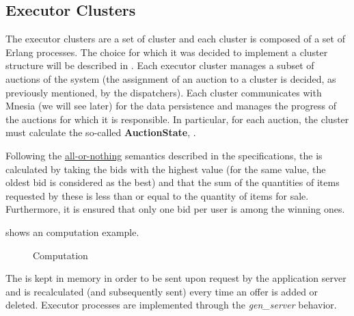 \subsection{Executor Clusters}\label{subsec:archexecutors}

The executor clusters are a set of cluster and each cluster is composed of a set
of Erlang processes. The choice for which it was decided to implement a cluster
structure will be described in . Each executor
cluster manages a subset of auctions of the system (the assignment of an auction
to a cluster is decided, as previously mentioned, by the dispatchers). Each
cluster communicates with Mnesia (we will see later) for the data persistence
and manages the progress of the auctions for which it is responsible. In
particular, for each auction, the cluster must calculate the so-called
\textbf{AuctionState}, .


Following the \underline{all-or-nothing} semantics described in the
specifications, the  is calculated by taking the bids with
the highest value (for the same value, the oldest bid is considered as the best)
and that the sum of the quantities of items requested by these is less than or
equal to the quantity of items for sale. Furthermore, it is ensured that only
one bid per user is among the winning ones.

 shows an  computation
example.

\begin{figure}[htb]
	\centering
	\caption{
	Computation}\label{fig:auction-state-example}
\end{figure}

The  is kept in memory in order to be sent upon request by
the application server and is recalculated (and subsequently sent) every time an
offer is added or deleted. Executor processes are implemented through the
\textit{gen\_server} behavior.
